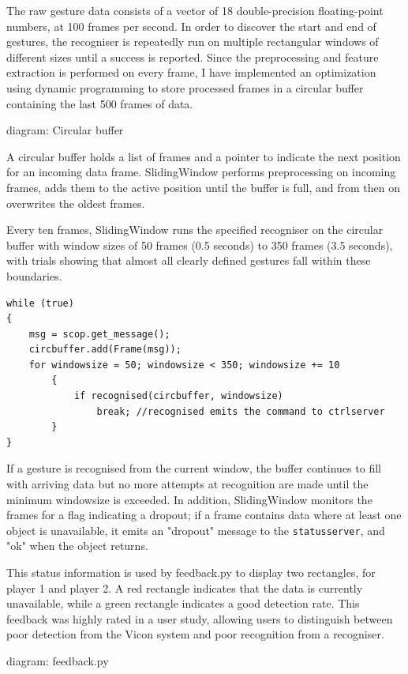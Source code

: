 \documentclass[12pt,a4,notitlepage]{report}
\renewcommand{\_}{\texttt{\symbol{95}}}
\newcommand{\<}{\texttt{\symbol{60}}}
\renewcommand{\>}{\texttt{\symbol{62}}}
\newcommand{\variable}[1]{\texttt{#1}}
\begin{document}
{The raw gesture data consists of a vector of 18 double-precision floating-point numbers, at 100 frames per second. In order to discover the start and end of gestures, the recogniser is repeatedly run on multiple rectangular windows of different sizes until a success is reported. Since the preprocessing and feature extraction is performed on every frame, I have implemented an optimization using dynamic programming to store processed frames in a circular buffer containing the last 500 frames of data.

{diagram: Circular buffer}

A circular buffer holds a list of frames and a pointer to indicate the next position for an incoming data frame. SlidingWindow performs preprocessing on  incoming frames, adds them to the active position until the buffer is full, and from then on overwrites the oldest frames.

Every ten frames, SlidingWindow runs the specified recogniser on the circular buffer with window sizes of 50 frames (0.5 seconds) to 350 frames (3.5 seconds), with trials showing that almost all clearly defined gestures fall within these boundaries.

\begin{verbatim}
while (true)
{
    msg = scop.get_message();
    circbuffer.add(Frame(msg));
    for windowsize = 50; windowsize < 350; windowsize += 10
        {
            if recognised(circbuffer, windowsize)
                break; //recognised emits the command to ctrlserver
        }
}
\end{verbatim}

If a gesture is recognised from the current window, the buffer continues to fill with arriving data but no more attempts at recognition are made until the minimum windowsize is exceeded. In addition, SlidingWindow monitors the frames for a flag indicating a dropout; if a frame contains data where at least one object is unavailable, it emits an "dropout" message to the \variable{statusserver}, and "ok" when the object returns.

This status information is used by feedback.py to display two rectangles, for player 1 and player 2. A red rectangle indicates that the data is currently unavailable, while a green rectangle indicates a good detection rate. This feedback was highly rated in a user study, allowing users to distinguish between poor detection from the Vicon system and poor recognition from a recogniser.

{diagram: feedback.py}

}
\end{document}

